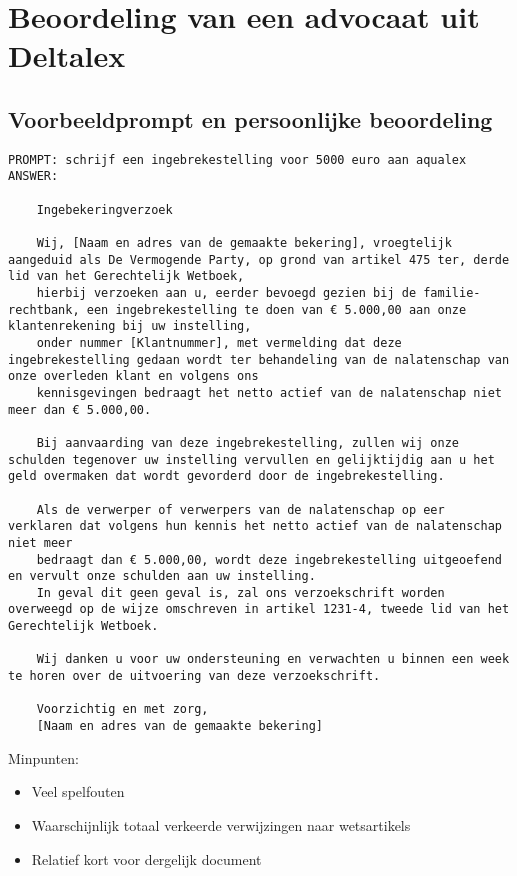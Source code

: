 \section{Beoordeling van een advocaat uit Deltalex}


\subsection{Voorbeeldprompt en persoonlijke beoordeling}
\begin{lstlisting}
PROMPT: schrijf een ingebrekestelling voor 5000 euro aan aqualex
ANSWER:

	Ingebekeringverzoek

	Wij, [Naam en adres van de gemaakte bekering], vroegtelijk aangeduid als De Vermogende Party, op grond van artikel 475 ter, derde lid van het Gerechtelijk Wetboek, 
	hierbij verzoeken aan u, eerder bevoegd gezien bij de familie- rechtbank, een ingebrekestelling te doen van € 5.000,00 aan onze klantenrekening bij uw instelling, 
	onder nummer [Klantnummer], met vermelding dat deze ingebrekestelling gedaan wordt ter behandeling van de nalatenschap van onze overleden klant en volgens ons 
	kennisgevingen bedraagt het netto actief van de nalatenschap niet meer dan € 5.000,00.

	Bij aanvaarding van deze ingebrekestelling, zullen wij onze schulden tegenover uw instelling vervullen en gelijktijdig aan u het geld overmaken dat wordt gevorderd door de ingebrekestelling.

	Als de verwerper of verwerpers van de nalatenschap op eer verklaren dat volgens hun kennis het netto actief van de nalatenschap niet meer 
	bedraagt dan € 5.000,00, wordt deze ingebrekestelling uitgeoefend en vervult onze schulden aan uw instelling. 
	In geval dit geen geval is, zal ons verzoekschrift worden overweegd op de wijze omschreven in artikel 1231-4, tweede lid van het Gerechtelijk Wetboek.

	Wij danken u voor uw ondersteuning en verwachten u binnen een week te horen over de uitvoering van deze verzoekschrift.

	Voorzichtig en met zorg,
	[Naam en adres van de gemaakte bekering]
\end{lstlisting}

Minpunten:
\begin {itemize}
\item Veel spelfouten
\item Waarschijnlijk totaal verkeerde verwijzingen naar wetsartikels
\item Relatief kort voor dergelijk document
\end{itemize}

